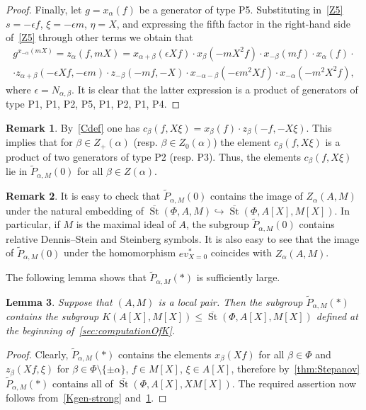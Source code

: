 \documentclass[oneside, 8pt]{amsart}
\newtheorem{lemma}{Lemma}
\theoremstyle{remark}
\theoremstyle{definition}
\numberwithin{lemma}{section}
\numberwithin{prop}{section}
\numberwithin{corollary}{section}
\numberwithin{externaltheorem}{section}
\newtheorem{rem}[lemma]{Remark}
\DeclareMathOperator{\St}{St}
\numberwithin{equation}{section}
\begin{document}
\begin{proof}
Finally, let $g = x_\alpha(f)$ be a generator of type P5. Substituting in~\eqref{Z5} $s = -\epsilon f$, $\xi = -\epsilon m$, $\eta=X$, and expressing the fifth factor in the right-hand side of~\eqref{Z5} through other terms we obtain that
\begin{multline} \label{eq:zalpha} g^{x_{-\alpha}(mX)} = z_\alpha(f, mX) = x_{\alpha+\beta}(\epsilon Xf) \cdot x_{\beta}(-mX^2 f) \cdot x_{-\beta}(mf) \cdot x_\alpha(f) \cdot \\ 
 \cdot z_{\alpha+\beta}(-\epsilon X f, -\epsilon m) \cdot z_{-\beta}(-mf, -X) \cdot x_{-\alpha-\beta}(-\epsilon m^2X f) \cdot x_{-\alpha}(-m^2X^2 f), \end{multline}
where $\epsilon = N_{\alpha, \beta}$. It is clear that the latter expression is a product of generators of type P1, P1, P2, P5, P1, P2, P1, P4. \end{proof}

\begin{rem}\label{rem:c} By~\eqref{Cdef} one has $c_\beta(f, X\xi) = x_{\beta} (f) \cdot z_{\beta}(-f, -X\xi)$. This implies that for $\beta \in Z_+(\alpha)$ (resp. $\beta \in Z_0(\alpha)$) the element $c_\beta(f, X\xi)$ is a product of two generators of type P2 (resp. P3).
Thus, the elements $c_{\beta}(f, X\xi)$ lie in $\widetilde{P}_{\alpha, M}(0)$ for all $\beta \in Z(\alpha)$. \end{rem}
\begin{rem}\label{rem:DS}
It is easy to check that $\widetilde{P}_{\alpha, M}(0)$ contains the image of $Z_\alpha(A, M)$ under the natural embedding of $\overline{\St}(\Phi, A, M) \hookrightarrow \overline{\St}(\Phi, A[X], M[X])$.
In particular, if $M$ is the maximal ideal of $A$, the subgroup $\widetilde{P}_{\alpha, M}(0)$ contains relative Dennis--Stein and Steinberg symbols. It is also easy to see that the image of $\widetilde{P}_{\alpha, M}(0)$ under the homomorphism $ev_{X=0}^*$ coincides with $Z_\alpha(A, M)$. \end{rem}

The following lemma shows that $\widetilde{P}_{\alpha, M}(*)$ is sufficiently large.
\begin{lemma} \label{Pstar-large} Suppose that $(A, M)$ is a local pair. 
Then the subgroup $\widetilde{P}_{\alpha, M}(*)$ contains the subgroup $K(A[X], M[X]) \leq \overline{\St}(\Phi, A[X], M[X])$ defined at the beginning of~\cref{sec:computationOfK}. \end{lemma}
\begin{proof} Clearly, $\widetilde{P}_{\alpha, M}(*)$ contains the elements $x_\beta(Xf)$ for all $\beta \in \Phi$ and $z_\beta(Xf, \xi)$ for $\beta \in \Phi \setminus \{\pm \alpha\}$, $f \in M[X]$, $\xi\in A[X]$, therefore by~\cref{thm:Stepanov} $\widetilde{P}_{\alpha, M}(*)$ contains all of $\overline{\St}(\Phi, A[X], XM[X])$. The required assertion now follows from~\cref{Kgen-strong} and~\cref{rem:c}. \end{proof}
\end{document}
